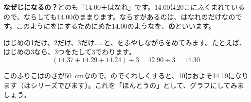 \noindent\textbf{なぜじになるの？}\quad どのも「14.00＋はなれ」です。14.00は20こにふくまれているので、ならしても14.00のままります。ならすがあるのは、はなれのだけなのです。このようにをにするためにめた14.00のようなを、\textbf{の}といいます。

はじめの1だけ、2だけ、3だけ……と、をふやしながらをめてみます。たとえば、はじめの3なら、3つをたして3でわります。
\[ (14.37+14.29+14.24)\div3=42.90\div3=14.30 \]

このふりこはのさが\qty{50}{cm}なので、のでくわしくすると、10はおよそ14.19になります（はシリーズでびます）。これを「ほんとうの」として、グラフにしてみましょう。

